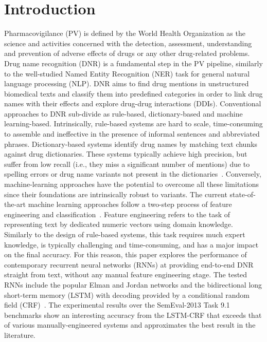 \documentclass[11pt,letterpaper]{article}
\begin{document}
\section{Introduction}
Pharmacovigilance (PV) is defined by the World Health Organization as the science and activities concerned with the detection, assessment, understanding and prevention of adverse effects of drugs or any other drug-related problems. Drug name recognition (DNR) is a fundamental step in the PV pipeline, similarly to  the well-studied Named Entity Recognition (NER) task for general natural language processing (NLP). DNR aims to find drug mentions in unstructured biomedical texts and classify them into predefined categories in order to link drug names with their effects and explore drug-drug interactions (DDIs). Conventional  approaches to DNR sub-divide as rule-based, dictionary-based and machine learning-based. Intrinsically, rule-based systems are hard to scale, time-consuming to assemble and ineffective in the presence of informal sentences and abbreviated phrases. Dictionary-based systems identify drug names by matching text chunks against drug dictionaries. These systems typically achieve high precision, but suffer from low recall (i.e., they miss a significant number of mentions) due to spelling errors or drug name variants not present in the dictionaries~\cite{liu2015drug}. Conversely, machine-learning approaches have the potential to overcome all these limitations since their foundations are intrinsically robust to variants. The current state-of-the-art machine learning approaches follow a two-step process of feature engineering and classification~\cite{segura2015exploring,abacha2015text,huber2013wbi}. Feature engineering refers to the task of representing text by dedicated numeric vectors using domain knowledge. Similarly to the design of rule-based systems, this task requires much expert knowledge, is typically challenging and time-consuming, and has a major impact on the final accuracy. For this reason, this paper explores the performance of contemporary recurrent neural networks (RNNs) at providing end-to-end DNR straight from text, without any manual feature engineering stage. The tested RNNs include the popular Elman and Jordan networks and the bidirectional long short-term memory (LSTM) with decoding provided by a conditional random field (CRF)~\cite{elman1990finding,jordan1986serial,lample2016neural,collobert2011natural}. The experimental results over the SemEval-2013 Task 9.1 benchmarks show an interesting accuracy from the LSTM-CRF that exceeds that of various manually-engineered systems and approximates the best result in the literature. 
\end{document}
